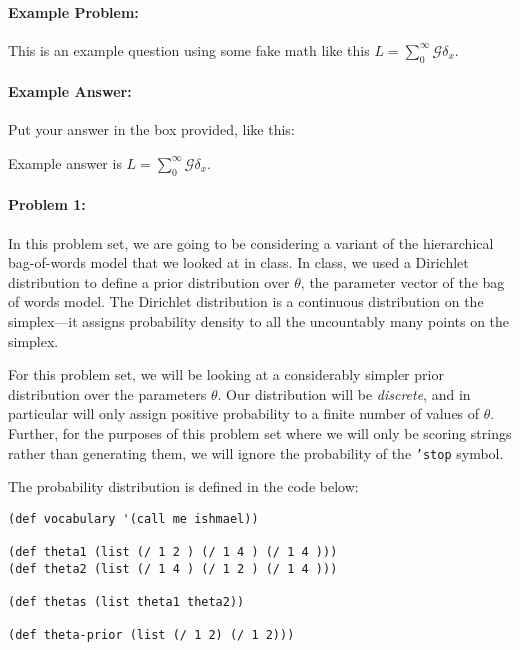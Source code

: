 \documentclass[10pt]{article}
\newenvironment{AnswerBox}{\begin{mdframed}[style=simple]}{\end{mdframed}}
\begin{document}
\hrulefill %

\paragraph{Example Problem:}
This is an example question using some fake math like this
$L=\sum_0^{\infty} \mathcal{G} \delta_x$.

\paragraph{Example Answer:} Put your answer in the box provided, like this:
\begin{AnswerBox}
Example answer is $L=\sum_0^{\infty} \mathcal{G} \delta_x$.
\end{AnswerBox}



\hrulefill%

\pagebreak%

\paragraph{Problem 1:}
In this problem set, we are going to be considering a variant of the
hierarchical bag-of-words model that we looked at in class. In class,
we used a Dirichlet distribution to define a prior distribution over
$\theta$, the parameter vector of the bag of words model. The
Dirichlet distribution is a continuous distribution on the
simplex---it assigns probability density to all the uncountably many
points on the simplex.

For this problem set, we will be looking at a considerably simpler
prior distribution over the parameters $\theta$. Our distribution will
be \emph{discrete}, and in particular will only assign positive
probability to a finite number of values of $\theta$. Further, for the
purposes of this problem set where we will only be scoring strings
rather than generating them, we will ignore the probability of the
\texttt{'stop} symbol.

The probability distribution is defined in the code below:

\begin{lstlisting}
(def vocabulary '(call me ishmael))

(def theta1 (list (/ 1 2 ) (/ 1 4 ) (/ 1 4 )))
(def theta2 (list (/ 1 4 ) (/ 1 2 ) (/ 1 4 )))

(def thetas (list theta1 theta2))

(def theta-prior (list (/ 1 2) (/ 1 2)))
\end{lstlisting}
\end{document}
